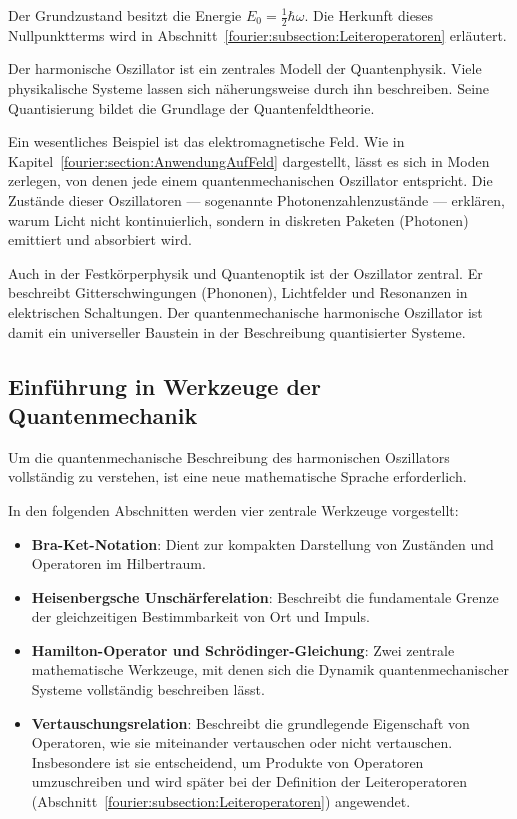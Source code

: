 	Der Grundzustand besitzt die Energie $E_0 = \frac{1}{2}\hbar \omega$.
	Die Herkunft dieses Nullpunktterms wird in Abschnitt~\ref{fourier:subsection:Leiteroperatoren} erläutert.

	Der harmonische Oszillator ist ein zentrales Modell der Quantenphysik.
	Viele physikalische Systeme lassen sich näherungsweise durch ihn beschreiben.
	Seine Quantisierung bildet die Grundlage der Quantenfeldtheorie.

	Ein wesentliches Beispiel ist das elektromagnetische Feld.
	Wie in Kapitel~\ref{fourier:section:AnwendungAufFeld} dargestellt, lässt es sich in Moden zerlegen, von denen jede einem quantenmechanischen Oszillator entspricht.
	Die Zustände dieser Oszillatoren --- sogenannte Photonenzahlenzustände ---
	erklären, warum Licht nicht kontinuierlich, sondern in diskreten Paketen (Photonen) emittiert und absorbiert wird.
	
	Auch in der Festkörperphysik und Quantenoptik ist der Oszillator zentral.
	Er beschreibt Gitterschwingungen (Phononen), Lichtfelder und Resonanzen in elektrischen Schaltungen.
	Der quantenmechanische harmonische Oszillator ist damit ein universeller Baustein in der Beschreibung quantisierter Systeme.

\subsection{Einführung in Werkzeuge der Quantenmechanik\label{fourier:subsection:werkzeugeQuantenmechanik}}
	Um die quantenmechanische Beschreibung des harmonischen Oszillators vollständig zu verstehen, ist eine neue mathematische Sprache erforderlich.
	
	In den folgenden Abschnitten werden vier zentrale Werkzeuge vorgestellt:
	\begin{itemize}
		\item \textbf{Bra-Ket-Notation}:
		Dient zur kompakten Darstellung von Zuständen und Operatoren im Hilbertraum.

		\item \textbf{Heisenbergsche Unschärferelation}:
		Beschreibt die fundamentale Grenze der gleichzeitigen Bestimmbarkeit von Ort und Impuls.

		\item \textbf{Hamilton-Operator und Schrödinger-Gleichung}:
		Zwei zentrale mathematische Werkzeuge, mit denen sich die Dynamik quantenmechanischer Systeme vollständig beschreiben lässt.
		
		\item \textbf{Vertauschungsrelation}:
		Beschreibt die grundlegende Eigenschaft von Operatoren, wie sie miteinander vertauschen oder nicht vertauschen.
		Insbesondere ist sie entscheidend, um Produkte von Operatoren umzuschreiben und wird später bei der Definition der Leiteroperatoren (Abschnitt~\ref{fourier:subsection:Leiteroperatoren}) angewendet.
	\end{itemize}

